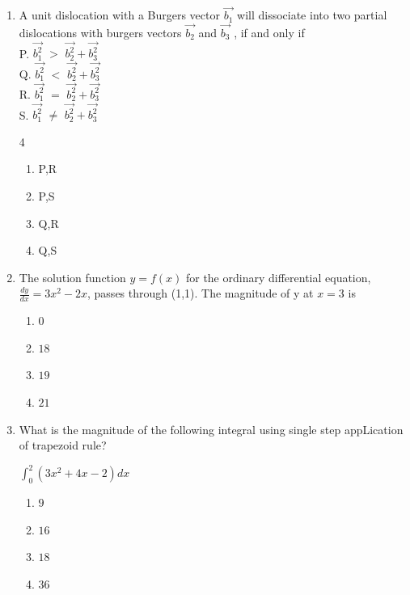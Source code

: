 \documentclass[journal]{IEEEtran}
\theoremstyle{remark}
\begin{document}
\begin{enumerate}
\item  A unit dislocation with a Burgers vector $\vec{b_1}$ will dissociate into two partial dislocations with burgers vectors $\vec{b_2}$ and $\vec{b_3}$ , if and only if  \hfill{}\\
P. $\vec{b_1^2}$ $>$ $\vec{b_2^2} + \vec{b_3^2}$\\
Q. $\vec{b_1^2}$ $<$ $\vec{b_2^2} + \vec{b_3^2}$\\
R. $\vec{b_1^2}$ $=$ $\vec{b_2^2} + \vec{b_3^2}$\\
S. $\vec{b_1^2}$ $\neq$ $\vec{b_2^2} + \vec{b_3^2}$\\
\begin {multicols}{4}
\begin{enumerate}
\item P,R
\item P,S
\item Q,R
\item Q,S
\end{enumerate}
\end{multicols}

\item The solution function $y=f(x)$ for the ordinary differential equation, $\frac{dy}{dx} = 3x^2 - 2x$, passes through (1,1). The magnitude of y at $x=3 $ is
\hfill{}
\begin{multicols}{4}
\begin{enumerate}
\item $0$
\item $18$
\item $19$
\item $21$
\end{enumerate}
\end{multicols}

\item What is the magnitude of the following integral using single step appLication of trapezoid rule?\hfill{}
\begin{center}
    

$\int_0^2(3x^2 + 4x  -2)dx$ 
\end{center}
\begin{multicols}{4}
\begin{enumerate}
\item $9$
\item $16$
\item $18$
\item $36$
\end{enumerate}
\end{multicols}


\end{enumerate}
\end{document}

